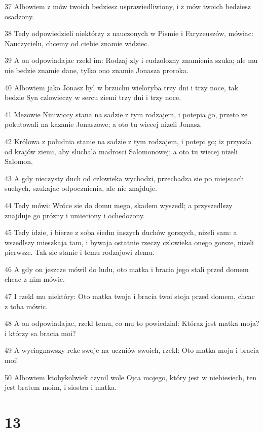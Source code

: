 \par 37 Albowiem z mów twoich bedziesz usprawiedliwiony, i z mów twoich bedziesz osadzony.
\par 38 Tedy odpowiedzieli niektórzy z nauczonych w Pismie i Faryzeuszów, mówiac: Nauczycielu, chcemy od ciebie znamie widziec.
\par 39 A on odpowiadajac rzekl im: Rodzaj zly i cudzolozny znamienia szuka; ale mu nie bedzie znamie dane, tylko ono znamie Jonasza proroka.
\par 40 Albowiem jako Jonasz byl w brzuchu wieloryba trzy dni i trzy noce, tak bedzie Syn czlowieczy w sercu ziemi trzy dni i trzy noce.
\par 41 Mezowie Niniwiccy stana na sadzie z tym rodzajem, i potepia go, przeto ze pokutowali na kazanie Jonaszowe; a oto tu wiecej nizeli Jonasz.
\par 42 Królowa z poludnia stanie na sadzie z tym rodzajem, i potepi go; iz przyszla od krajów ziemi, aby sluchala madrosci Salomonowej; a oto tu wiecej nizeli Salomon.
\par 43 A gdy nieczysty duch od czlowieka wychodzi, przechadza sie po miejscach suchych, szukajac odpocznienia, ale nie znajduje.
\par 44 Tedy mówi: Wróce sie do domu mego, skadem wyszedl; a przyszedlszy znajduje go prózny i umieciony i ochedozony.
\par 45 Tedy idzie, i bierze z soba siedm inszych duchów gorszych, nizeli sam: a wszedlszy mieszkaja tam, i bywaja ostatnie rzeczy czlowieka onego gorsze, nizeli pierwsze. Tak sie stanie i temu rodzajowi zlemu.
\par 46 A gdy on jeszcze mówil do ludu, oto matka i bracia jego stali przed domem chcac z nim mówic.
\par 47 I rzekl mu niektóry: Oto matka twoja i bracia twoi stoja przed domem, chcac z toba mówic.
\par 48 A on odpowiadajac, rzekl temu, co mu to powiedzial: Któraz jest matka moja? i którzy sa bracia moi?
\par 49 A wyciagnawszy reke swoje na uczniów swoich, rzekl: Oto matka moja i bracia moi!
\par 50 Albowiem ktobykolwiek czynil wole Ojca mojego, który jest w niebiesiech, ten jest bratem moim, i siostra i matka.

\chapter{13}

